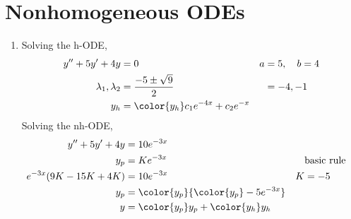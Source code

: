 \section{Nonhomogeneous ODEs}


\begin{enumerate}
    \item Solving the h-ODE,
          \begin{align}
              y'' + 5y' + 4y           & = 0                                      & a & = 5, \quad b = 4 \\
              \lambda_{1}, \lambda_{2} & = \frac{-5 \pm \sqrt{9}}{2}              &   & = -4, -1         \\
              y_{h}                    & = \color{y_h} c_{1}e^{-4x} + c_{2}e^{-x}
          \end{align}
          Solving the nh-ODE,
          \begin{align}
              y'' + 5y' + 4y         & = 10e^{-3x}                                                         \\
              y_{p}                  & = Ke^{-3x}                                  &   & \text{basic rule} \\
              e^{-3x}(9K - 15K + 4K) & = 10e^{-3x}                                 & K & = -5              \\
              y_{p}                  & = \color{y_p} {\color{y_p} -5e^{-3x}}                               \\
              y                      & = {\color{y_p} y_{p}} + {\color{y_h} y_{h}}
          \end{align}


\end{enumerate}
